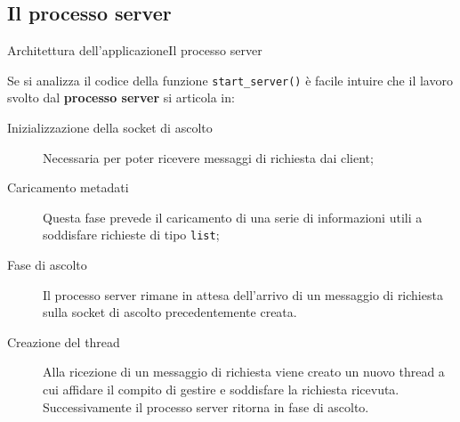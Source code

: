 \documentclass[10pt]{beamer}
\begin{document}
\subsection{Il processo server}
\begin{frame}{Architettura dell'applicazione}{Il processo server}

Se si analizza il codice della funzione \texttt{start\_server()} è facile intuire che il lavoro svolto dal \textbf{processo server} si articola in:

\begin{description}


\item[Inizializzazione della socket di ascolto] Necessaria per poter ricevere messaggi di richiesta dai client;
\item[Caricamento metadati] Questa fase prevede il caricamento di una serie di informazioni utili a soddisfare richieste di tipo \texttt{list};
\item[Fase di ascolto] Il processo server rimane in attesa dell'arrivo di un messaggio di richiesta sulla socket di ascolto precedentemente creata.
\item[Creazione del thread] Alla ricezione di un messaggio di richiesta viene creato un nuovo thread a cui affidare il compito di gestire e soddisfare la richiesta ricevuta. Successivamente il processo server ritorna in fase di ascolto.
\end{description}

\end{frame}

\end{document}
